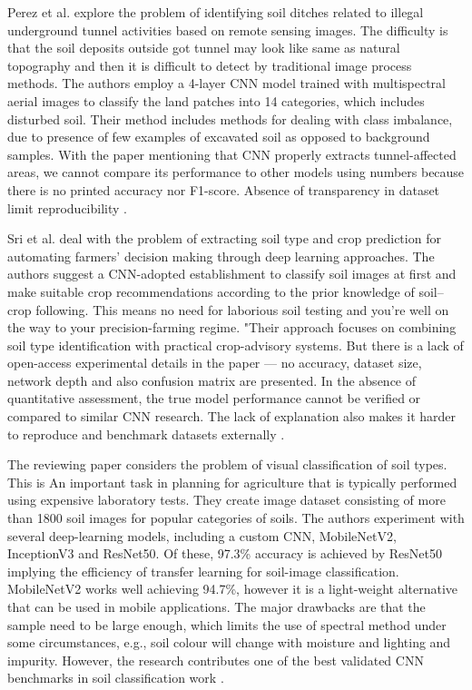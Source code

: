 \documentclass[conference]{IEEEtran}
\begin{document}
Perez et al.\cite{b5} explore the problem of identifying soil ditches related to illegal underground tunnel activities based on remote sensing images. The difficulty is that the soil deposits outside got tunnel may look like same as natural topography and then it is difficult to detect by traditional image process methods. The authors employ a 4-layer CNN model trained with multispectral aerial images to classify the land patches into 14 categories, which includes disturbed soil. Their method includes methods for dealing with class imbalance, due to presence of few examples of excavated soil as opposed to background samples. With the paper mentioning that CNN properly extracts tunnel-affected areas, we cannot compare its performance to other models using numbers because there is no printed accuracy nor F1-score. Absence of transparency in dataset limit reproducibility \cite{b5}.
\vspace{5pt}


Sri et al. \cite{b6} deal with the problem of extracting soil type and crop prediction for automating farmers’ decision making through deep learning approaches. The authors suggest a CNN-adopted establishment to classify soil images at first and make suitable crop recommendations according to the prior knowledge of soil–crop following. This means no need for laborious soil testing and you're well on the way to your precision-farming regime. "Their approach focuses on combining soil type identification with practical crop-advisory systems. But there is a lack of open-access experimental details in the paper — no accuracy, dataset size, network depth and also confusion matrix are presented. In the absence of quantitative assessment, the true model performance cannot be verified or compared to similar CNN research. The lack of explanation also makes it harder to reproduce and benchmark datasets externally \cite{b6}.
\vspace{5pt}


The reviewing paper considers the problem of visual classification of soil types. This is An important task in planning for agriculture that is typically performed using expensive laboratory tests. They create image dataset consisting of more than 1800 soil images for popular categories of soils. The authors experiment with several deep-learning models, including a custom CNN, MobileNetV2, InceptionV3 and ResNet50. Of these, 97.3\% accuracy is achieved by ResNet50 implying the efficiency of transfer learning for soil-image classification. MobileNetV2 works well achieving 94.7\%, however it is a light-weight alternative that can be used in mobile applications. The major drawbacks are that the sample need to be large enough, which limits the use of spectral method under some circumstances, e.g., soil colour will change with moisture and lighting and impurity. However, the research contributes one of the best validated CNN benchmarks in soil classification work \cite{b7}.
\vspace{5pt}
\end{document}
